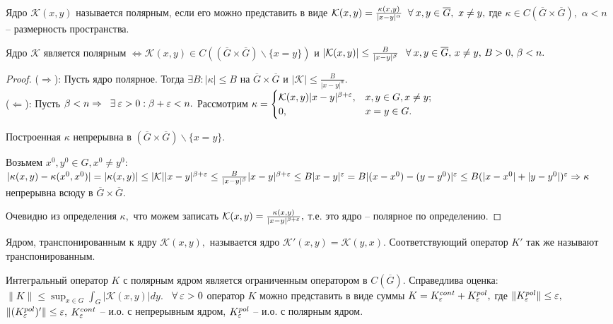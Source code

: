 \begin{definition}
Ядро $\mathcal{K}(x,y)$ называется полярным, если его можно представить в виде $\mathcal{K}(x,y) = \frac{\kappa(x,y)}{|x-y|^\alpha} \;\;\forall\: x,y \in \overline{G},\ x\ne y,$ где $\kappa \in C(\overline{G} \times \overline{G}),$ $\alpha < n$ -- размерность пространства.
\end{definition}

\begin{lemma}
Ядро $\mathcal{K}$ является полярным $\Leftrightarrow \mathcal{K}(x,y) \in C((\overline{G} \times \overline{G})\backslash\{x=y\})$ и $|\mathcal{K}(x,y)| \le \frac{B}{|x-y|^\beta} \, \;\;\forall\: x, y \in \overline{G}, \, x \ne y, \, B>0, \, \beta < n.$
\end{lemma}

\begin{proof}
($\Rightarrow$): Пусть ядро полярное. Тогда $\exists B: |\kappa| \le B$ на $\overline{G} \times \overline{G}$ и $|\mathcal{K}| \le \frac{B}{|x-y|^\alpha}.$
\\
($\Leftarrow$): Пусть $\beta < n \Rightarrow \;\;\exists\: \varepsilon > 0: \beta+\varepsilon < n.$ Рассмотрим $\kappa =  \begin{cases}
   \mathcal{K}(x,y)|x-y|^{\beta+\varepsilon}, &x,y\in G, x\ne y;\\
   0, & x=y\in G.
 \end{cases}
$

Построенная $\kappa$ непрерывна в $(\overline{G} \times \overline{G})\backslash\{x=y\}.$

Возьмем $x^0,y^0 \in G, x^0 \ne y^0:$
$|\kappa(x,y) - \kappa(x^0, x^0)| = |\kappa(x,y)| \le |\mathcal{K}||x-y|^{\beta+\varepsilon} \le \frac{B}{|x-y|^\beta}|x-y|^{\beta+\varepsilon}\le B|x-y|^\varepsilon = B|(x-x^0)-(y-y^0)|^\varepsilon \le B(|x-x^0|+|y-y^0|)^\varepsilon \Rightarrow \kappa$ непрерывна всюду в $\overline{G} \times \overline{G}.$

Очевидно из определения $\kappa,$ что можем записать $\mathcal{K}(x,y) = \frac{\kappa(x,y)}{|x-y|^{\beta+\varepsilon}},$ т.е. это ядро -- полярное по определению.
\end{proof}


\begin{definition}
Ядром, транспонированным к ядру $\mathcal{K}(x,y),$ называется ядро $\mathcal{K}'(x,y) = \mathcal{K}(y,x).$ Соответствующий оператор $K'$ так же называют транспонированным.
\end{definition}

\begin{theorem}
Интегральный оператор $K$ с полярным ядром является ограниченным оператором в $C(\overline{G}).$ Справедлива оценка: $\|K\| \le \sup_{x\in G}\int_G|\mathcal{K}(x,y)|dy.$ $\;\;\forall\: \varepsilon > 0$ оператор $K$ можно представить в виде суммы $K = K_\varepsilon^{cont}+K_\varepsilon^{pol},$ где $\|K_\varepsilon^{pol}\| \le \varepsilon,$ $\|(K_\varepsilon^{pol})'\| \le \varepsilon,$ $K_\varepsilon^{cont}$ -- и.о. с непрерывным ядром, $K_\varepsilon^{pol}$ -- и.о. с полярным ядром.
\end{theorem}

